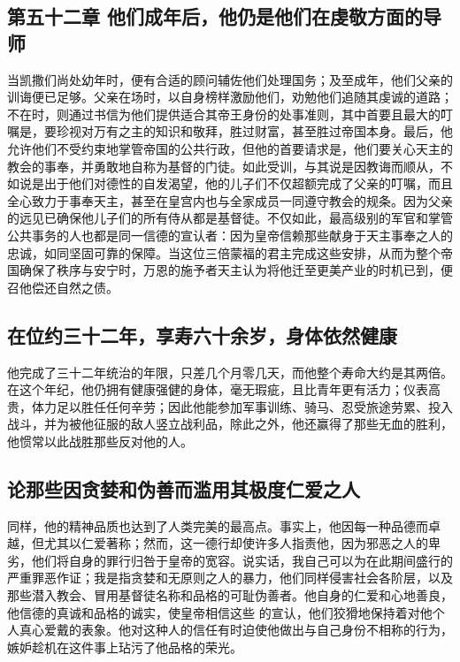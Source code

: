 
\subsection{第五十二章 他们成年后，他仍是他们在虔敬方面的导师}

当凯撒们尚处幼年时，便有合适的顾问辅佐他们处理国务；及至成年，他们父亲的训诲便已足够。父亲在场时，以自身榜样激励他们，劝勉他们追随其虔诚的道路；不在时，则通过书信为他们提供适合其帝王身份的处事准则，其中首要且最大的叮嘱是，要珍视对万有之主的知识和敬拜，胜过财富，甚至胜过帝国本身。最后，他允许他们不受约束地掌管帝国的公共行政，但他的首要请求是，他们要关心天主的教会的事奉，并勇敢地自称为基督的门徒。如此受训，与其说是因教诲而顺从，不如说是出于他们对德性的自发渴望，他的儿子们不仅超额完成了父亲的叮嘱，而且全心致力于事奉天主，甚至在皇宫内也与全家成员一同遵守教会的规条。因为父亲的远见已确保他儿子们的所有侍从都是基督徒。不仅如此，最高级别的军官和掌管公共事务的人也都是同一信德的宣认者：因为皇帝信赖那些献身于天主事奉之人的忠诚，如同坚固可靠的保障。当这位三倍蒙福的君主完成这些安排，从而为整个帝国确保了秩序与安宁时，万恩的施予者天主认为将他迁至更美产业的时机已到，便召他偿还自然之债。\par


\subsection{在位约三十二年，享寿六十余岁，身体依然健康}

他完成了三十二年统治的年限，只差几个月零几天，而他整个寿命大约是其两倍。在这个年纪，他仍拥有健康强健的身体，毫无瑕疵，且比青年更有活力；仪表高贵，体力足以胜任任何辛劳；因此他能参加军事训练、骑马、忍受旅途劳累、投入战斗，并为被他征服的敌人竖立战利品，除此之外，他还赢得了那些无血的胜利，他惯常以此战胜那些反对他的人。\par


\subsection{论那些因贪婪和伪善而滥用其极度仁爱之人}

同样，他的精神品质也达到了人类完美的最高点。事实上，他因每一种品德而卓越，但尤其以仁爱著称；然而，这一德行却使许多人指责他，因为邪恶之人的卑劣，他们将自身的罪行归咎于皇帝的宽容。说实话，我自己可以为在此期间盛行的严重罪恶作证；我是指贪婪和无原则之人的暴力，他们同样侵害社会各阶层，以及那些潜入教会、冒用基督徒名称和品格的可耻伪善者。他自身的仁爱和心地善良，他信德的真诚和品格的诚实，使皇帝相信这些  的宣认，他们狡猾地保持着对他个人真心爱戴的表象。他对这种人的信任有时迫使他做出与自己身份不相称的行为，嫉妒趁机在这件事上玷污了他品格的荣光。\par

